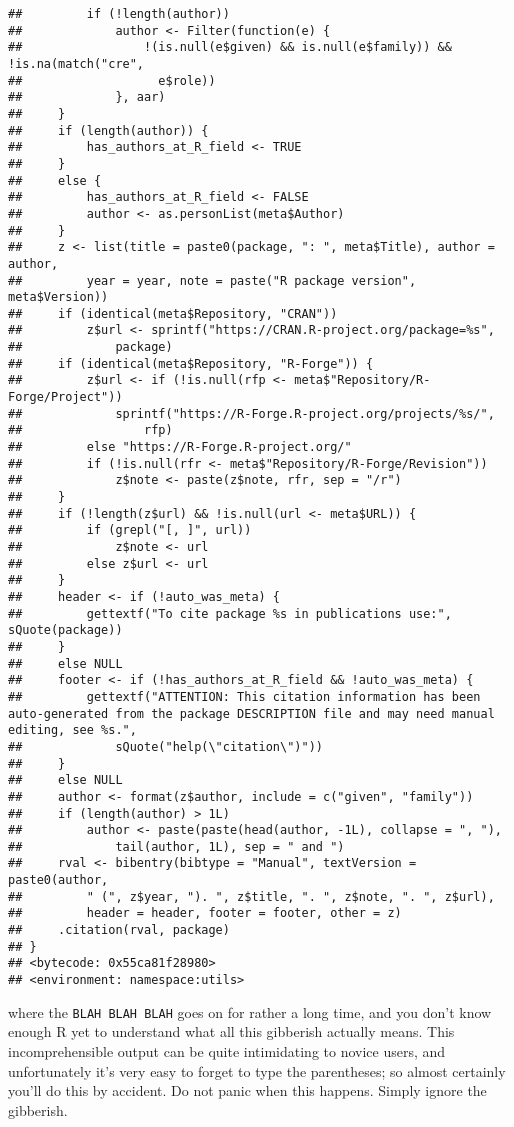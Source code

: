 \documentclass[]{book}
\begin{document}
\begin{verbatim}
##         if (!length(author)) 
##             author <- Filter(function(e) {
##                 !(is.null(e$given) && is.null(e$family)) && !is.na(match("cre", 
##                   e$role))
##             }, aar)
##     }
##     if (length(author)) {
##         has_authors_at_R_field <- TRUE
##     }
##     else {
##         has_authors_at_R_field <- FALSE
##         author <- as.personList(meta$Author)
##     }
##     z <- list(title = paste0(package, ": ", meta$Title), author = author, 
##         year = year, note = paste("R package version", meta$Version))
##     if (identical(meta$Repository, "CRAN")) 
##         z$url <- sprintf("https://CRAN.R-project.org/package=%s", 
##             package)
##     if (identical(meta$Repository, "R-Forge")) {
##         z$url <- if (!is.null(rfp <- meta$"Repository/R-Forge/Project")) 
##             sprintf("https://R-Forge.R-project.org/projects/%s/", 
##                 rfp)
##         else "https://R-Forge.R-project.org/"
##         if (!is.null(rfr <- meta$"Repository/R-Forge/Revision")) 
##             z$note <- paste(z$note, rfr, sep = "/r")
##     }
##     if (!length(z$url) && !is.null(url <- meta$URL)) {
##         if (grepl("[, ]", url)) 
##             z$note <- url
##         else z$url <- url
##     }
##     header <- if (!auto_was_meta) {
##         gettextf("To cite package %s in publications use:", sQuote(package))
##     }
##     else NULL
##     footer <- if (!has_authors_at_R_field && !auto_was_meta) {
##         gettextf("ATTENTION: This citation information has been auto-generated from the package DESCRIPTION file and may need manual editing, see %s.", 
##             sQuote("help(\"citation\")"))
##     }
##     else NULL
##     author <- format(z$author, include = c("given", "family"))
##     if (length(author) > 1L) 
##         author <- paste(paste(head(author, -1L), collapse = ", "), 
##             tail(author, 1L), sep = " and ")
##     rval <- bibentry(bibtype = "Manual", textVersion = paste0(author, 
##         " (", z$year, "). ", z$title, ". ", z$note, ". ", z$url), 
##         header = header, footer = footer, other = z)
##     .citation(rval, package)
## }
## <bytecode: 0x55ca81f28980>
## <environment: namespace:utils>
\end{verbatim}

where the \texttt{BLAH\ BLAH\ BLAH} goes on for rather a long time, and you don't know enough R yet to understand what all this gibberish actually means. This incomprehensible output can be quite intimidating to novice users, and unfortunately it's very easy to forget to type the parentheses; so almost certainly you'll do this by accident. Do not panic when this happens. Simply ignore the gibberish.
\end{document}
